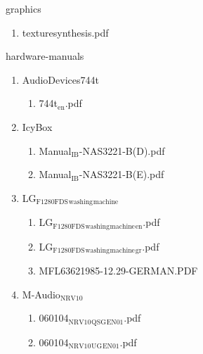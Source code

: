 \documentclass[11pt]{article}
\begin{document}
\item graphics
\label{sec-1-1-1-1-22}
\begin{enumerate}
\item texturesynthesis.pdf
\label{sec-1-1-1-1-22-1}
\end{enumerate}

\item hardware-manuals
\label{sec-1-1-1-1-23}
\begin{enumerate}
\item AudioDevices744t
\label{sec-1-1-1-1-23-1}
\begin{enumerate}
\item 744t$_{\text{en}}$.pdf
\label{sec-1-1-1-1-23-1-1}
\end{enumerate}

\item IcyBox
\label{sec-1-1-1-1-23-2}
\begin{enumerate}
\item Manual$_{\text{IB}}$-NAS3221-B(D).pdf
\label{sec-1-1-1-1-23-2-1}

\item Manual$_{\text{IB}}$-NAS3221-B(E).pdf
\label{sec-1-1-1-1-23-2-2}
\end{enumerate}

\item LG$_{\text{F1280FDS}}$$_{\text{washing}}$$_{\text{machine}}$
\label{sec-1-1-1-1-23-3}
\begin{enumerate}
\item LG$_{\text{F1280FDS}}$$_{\text{washing}}$$_{\text{machine}}$$_{\text{en}}$.pdf
\label{sec-1-1-1-1-23-3-1}

\item LG$_{\text{F1280FDS}}$$_{\text{washing}}$$_{\text{machine}}$$_{\text{gr}}$.pdf
\label{sec-1-1-1-1-23-3-2}

\item MFL63621985-12.29-GERMAN.PDF
\label{sec-1-1-1-1-23-3-3}
\end{enumerate}

\item M-Audio$_{\text{NRV10}}$
\label{sec-1-1-1-1-23-4}
\begin{enumerate}
\item 060104$_{\text{NRV10}}$$_{\text{QSG}}$$_{\text{EN01}}$.pdf
\label{sec-1-1-1-1-23-4-1}

\item 060104$_{\text{NRV10}}$$_{\text{UG}}$$_{\text{EN01}}$.pdf
\label{sec-1-1-1-1-23-4-2}
\end{enumerate}


\end{enumerate}
\end{document}
